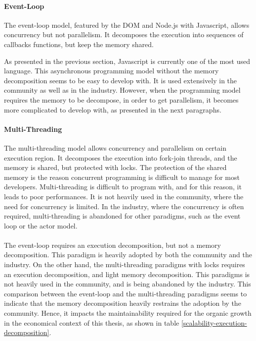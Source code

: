 \paragraph{Event-Loop}

The event-loop model, featured by the DOM and Node.js with Javascript, allows concurrency but not parallelism.
It decomposes the execution into sequences of callbacks functions, but keep the memory shared.

As presented in the previous section, Javascript is currently one of the most used language.
This asynchronous programming model without the memory decomposition seems to be easy to develop with.
It is used extensively in the community as well as in the industry.
However, when the programming model requires the memory to be decompose, in order to get parallelism, it becomes more complicated to develop with, as presented in the next paragraphs.

\paragraph{Multi-Threading}

The multi-threading model allows concurrency and parallelism on certain execution region.
It decomposes the execution into fork-join threads, and the memory is shared, but protected with locks.
The protection of the shared memory is the reason concurrent programming is difficult to manage for most developers.
Multi-threading is difficult to program with, and for this reason, it leads to poor performances.
It is not heavily used in the community, where the need for concurrency is limited.
In the industry, where the concurrency is often required, multi-threading is abandoned for other paradigms, such as the event loop or the actor model.

\paragraph{}

The event-loop requires an execution decomposition, but not a memory decomposition.
This paradigm is heavily adopted by both the community and the industry.
On the other hand, the multi-threading paradigms with locks requires an execution decomposition, and light memory decomposition.
This paradigms is not heavily used in the community, and is being abandoned by the industry.
This comparison between the event-loop and the multi-threading paradigms seems to indicate that the memory decomposition heavily restrains the adoption by the community.
Hence, it impacts the maintainability required for the organic growth in the economical context of this thesis, as shown in table \ref{scalability-execution-decomposition}.

